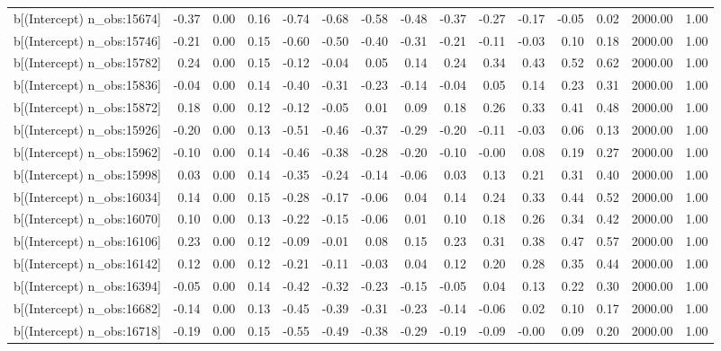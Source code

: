 \begin{table}[ht]
\begin{tabular}{rrrrrrrrrrrrrrr}
  b[(Intercept) n\_obs:15674] & -0.37 & 0.00 & 0.16 & -0.74 & -0.68 & -0.58 & -0.48 & -0.37 & -0.27 & -0.17 & -0.05 & 0.02 & 2000.00 & 1.00 \\ 
  b[(Intercept) n\_obs:15746] & -0.21 & 0.00 & 0.15 & -0.60 & -0.50 & -0.40 & -0.31 & -0.21 & -0.11 & -0.03 & 0.10 & 0.18 & 2000.00 & 1.00 \\ 
  b[(Intercept) n\_obs:15782] & 0.24 & 0.00 & 0.15 & -0.12 & -0.04 & 0.05 & 0.14 & 0.24 & 0.34 & 0.43 & 0.52 & 0.62 & 2000.00 & 1.00 \\ 
  b[(Intercept) n\_obs:15836] & -0.04 & 0.00 & 0.14 & -0.40 & -0.31 & -0.23 & -0.14 & -0.04 & 0.05 & 0.14 & 0.23 & 0.31 & 2000.00 & 1.00 \\ 
  b[(Intercept) n\_obs:15872] & 0.18 & 0.00 & 0.12 & -0.12 & -0.05 & 0.01 & 0.09 & 0.18 & 0.26 & 0.33 & 0.41 & 0.48 & 2000.00 & 1.00 \\ 
  b[(Intercept) n\_obs:15926] & -0.20 & 0.00 & 0.13 & -0.51 & -0.46 & -0.37 & -0.29 & -0.20 & -0.11 & -0.03 & 0.06 & 0.13 & 2000.00 & 1.00 \\ 
  b[(Intercept) n\_obs:15962] & -0.10 & 0.00 & 0.14 & -0.46 & -0.38 & -0.28 & -0.20 & -0.10 & -0.00 & 0.08 & 0.19 & 0.27 & 2000.00 & 1.00 \\ 
  b[(Intercept) n\_obs:15998] & 0.03 & 0.00 & 0.14 & -0.35 & -0.24 & -0.14 & -0.06 & 0.03 & 0.13 & 0.21 & 0.31 & 0.40 & 2000.00 & 1.00 \\ 
  b[(Intercept) n\_obs:16034] & 0.14 & 0.00 & 0.15 & -0.28 & -0.17 & -0.06 & 0.04 & 0.14 & 0.24 & 0.33 & 0.44 & 0.52 & 2000.00 & 1.00 \\ 
  b[(Intercept) n\_obs:16070] & 0.10 & 0.00 & 0.13 & -0.22 & -0.15 & -0.06 & 0.01 & 0.10 & 0.18 & 0.26 & 0.34 & 0.42 & 2000.00 & 1.00 \\ 
  b[(Intercept) n\_obs:16106] & 0.23 & 0.00 & 0.12 & -0.09 & -0.01 & 0.08 & 0.15 & 0.23 & 0.31 & 0.38 & 0.47 & 0.57 & 2000.00 & 1.00 \\ 
  b[(Intercept) n\_obs:16142] & 0.12 & 0.00 & 0.12 & -0.21 & -0.11 & -0.03 & 0.04 & 0.12 & 0.20 & 0.28 & 0.35 & 0.44 & 2000.00 & 1.00 \\ 
  b[(Intercept) n\_obs:16394] & -0.05 & 0.00 & 0.14 & -0.42 & -0.32 & -0.23 & -0.15 & -0.05 & 0.04 & 0.13 & 0.22 & 0.30 & 2000.00 & 1.00 \\ 
  b[(Intercept) n\_obs:16682] & -0.14 & 0.00 & 0.13 & -0.45 & -0.39 & -0.31 & -0.23 & -0.14 & -0.06 & 0.02 & 0.10 & 0.17 & 2000.00 & 1.00 \\ 
  b[(Intercept) n\_obs:16718] & -0.19 & 0.00 & 0.15 & -0.55 & -0.49 & -0.38 & -0.29 & -0.19 & -0.09 & -0.00 & 0.09 & 0.20 & 2000.00 & 1.00 \\ 

\end{tabular}
\end{table}
